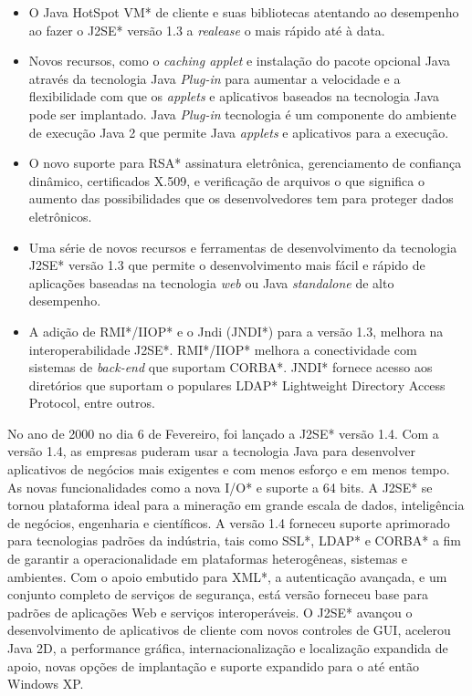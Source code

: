 \begin{itemize}
  \item O Java HotSpot VM* de cliente e suas bibliotecas atentando ao desempenho ao fazer o J2SE* versão 1.3 a {\it realease} o mais rápido até à data.
  \item Novos recursos, como o {\it caching applet} e instalação do pacote opcional Java através da tecnologia Java {\it  Plug-in} para aumentar a velocidade e a flexibilidade com que os {\it applets} e aplicativos baseados na tecnologia Java pode ser implantado. Java {\it  Plug-in} tecnologia é um componente do ambiente de execução Java 2 que permite Java {\it applets} e aplicativos para a execução.
  \item O novo suporte para RSA* assinatura eletrônica, gerenciamento de confiança dinâmico, certificados X.509, e verificação de arquivos o que significa o aumento das possibilidades que os desenvolvedores tem para proteger dados eletrônicos.
  \item Uma série de novos recursos e ferramentas de desenvolvimento da tecnologia J2SE* versão 1.3 que permite o desenvolvimento mais fácil e rápido de aplicações baseadas na tecnologia {\it web} ou Java {\it  standalone} de alto desempenho.
  \item A adição de RMI*/IIOP* e o Jndi (JNDI*) para a versão 1.3, melhora na interoperabilidade J2SE*. RMI*/IIOP* melhora a conectividade com sistemas de {\it  back-end} que suportam CORBA*. JNDI* fornece acesso aos diretórios que suportam o populares LDAP* Lightweight Directory Access Protocol, entre outros.\\
\end{itemize}

No ano de 2000 no dia 6 de Fevereiro, foi lançado a J2SE* versão 1.4. Com a versão 1.4, as empresas puderam usar a tecnologia Java para desenvolver aplicativos de negócios mais exigentes e com menos esforço e em menos tempo. As novas funcionalidades como a nova I/O* e suporte a 64 bits. A J2SE* se tornou plataforma ideal para a mineração em grande escala de dados, inteligência de negócios, engenharia e científicos. A versão 1.4 forneceu suporte aprimorado para tecnologias padrões da indústria, tais como SSL*, LDAP* e CORBA* a fim de garantir a operacionalidade em plataformas heterogêneas, sistemas e ambientes. Com o apoio embutido para XML*, a autenticação avançada, e um conjunto completo de serviços de segurança, está versão forneceu base para padrões de aplicações Web e serviços interoperáveis. O J2SE* avançou o desenvolvimento de aplicativos de cliente com novos controles de GUI, acelerou Java 2D, a performance gráfica, internacionalização e localização expandida de apoio, novas opções de implantação e suporte expandido para o até então Windows XP.\\


